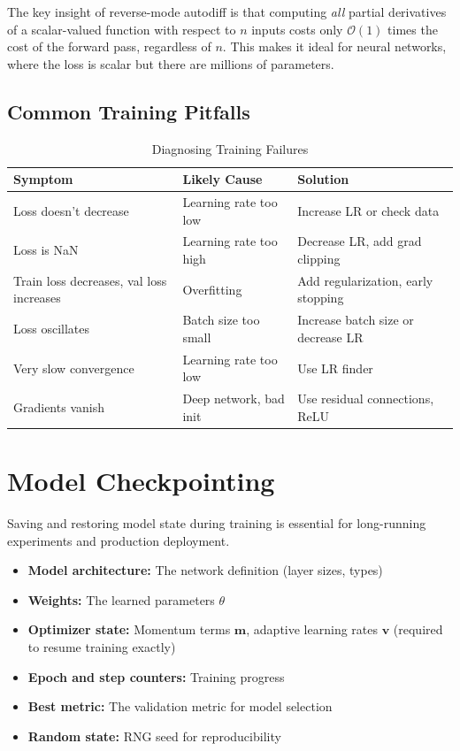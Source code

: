The key insight of reverse-mode autodiff is that computing \emph{all} partial derivatives of a scalar-valued function with respect to $n$ inputs costs only $\mathcal{O}(1)$ times the cost of the forward pass, regardless of $n$. This makes it ideal for neural networks, where the loss is scalar but there are millions of parameters.

\subsection{Common Training Pitfalls}

\begin{table}[ht]
    \centering
    \caption{Diagnosing Training Failures}
    \begin{tabular}{L{4cm} L{5cm} L{4.5cm}}
        \toprule
        \textbf{Symptom} & \textbf{Likely Cause} & \textbf{Solution} \\
        \midrule
        Loss doesn't decrease & Learning rate too low & Increase LR or check data \\
        Loss is NaN & Learning rate too high & Decrease LR, add grad clipping \\
        Train loss decreases, val loss increases & Overfitting & Add regularization, early stopping \\
        Loss oscillates & Batch size too small & Increase batch size or decrease LR \\
        Very slow convergence & Learning rate too low & Use LR finder \\
        Gradients vanish & Deep network, bad init & Use residual connections, ReLU \\
        \bottomrule
    \end{tabular}
\end{table}

\section{Model Checkpointing}

Saving and restoring model state during training is essential for long-running experiments and production deployment.

\begin{itemize}
    \item \textbf{Model architecture:} The network definition (layer sizes, types)
    \item \textbf{Weights:} The learned parameters $\theta$
    \item \textbf{Optimizer state:} Momentum terms $\mathbf{m}$, adaptive learning rates $\mathbf{v}$ (required to resume training exactly)
    \item \textbf{Epoch and step counters:} Training progress
    \item \textbf{Best metric:} The validation metric for model selection
    \item \textbf{Random state:} RNG seed for reproducibility
\end{itemize}

